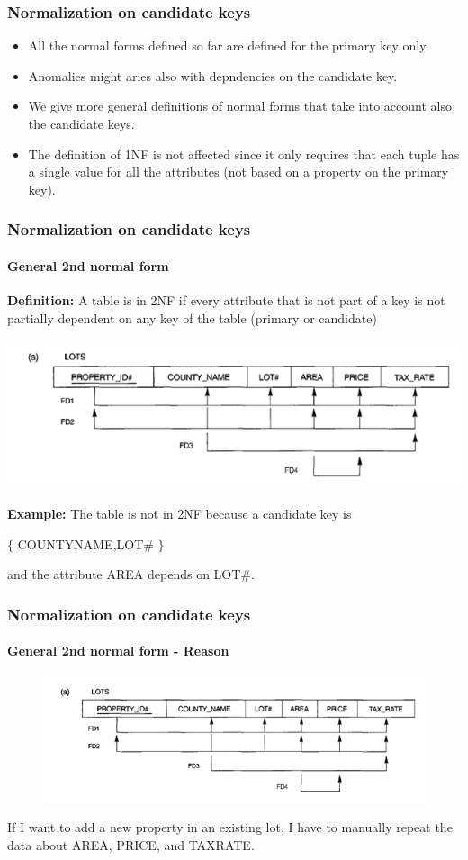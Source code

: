 \documentclass{beamer}
\newcommand{\valseq}[1]{$\lbrace$ #1 $\rbrace$}
\begin{document}

\begin{frame}
	\frametitle{Normalization on candidate keys}
	
	\begin{itemize}
		\item All the normal forms defined so far are defined for the primary key only.
		\item Anomalies might aries also with depndencies on the candidate key.
		\item We give more general definitions of normal forms that take into account also the candidate keys.
		\item The definition of 1NF is not affected since it only requires that each tuple has a single value for all the attributes (not based on a property on the primary key).		
	\end{itemize}
\end{frame}

\begin{frame}
	\frametitle{Normalization on candidate keys}
	\framesubtitle{General 2nd normal form}
	
	\textbf{Definition:}
	A table is in 2NF if every attribute that is not part of a key is not partially dependent on any key of the table (primary or candidate)
	
	\includegraphics[scale=0.4]{img/normalization/norm12}
	
	\textbf{Example:}
	The table is not in 2NF because a candidate key is
	
	\valseq{COUNTY\textunderscore NAME,LOT\#} 
	
	and the attribute AREA depends on LOT\#.
\end{frame}

\begin{frame}
	\frametitle{Normalization on candidate keys}
	\framesubtitle{General 2nd normal form - Reason}
	
	\begin{figure}
		\includegraphics[scale=0.4]{img/normalization/norm12}
	\end{figure}
	
	If I want to add a new property in an existing lot, I have to manually repeat the data about AREA, PRICE, and TAX\textunderscore RATE.
\end{frame}
\end{document}
